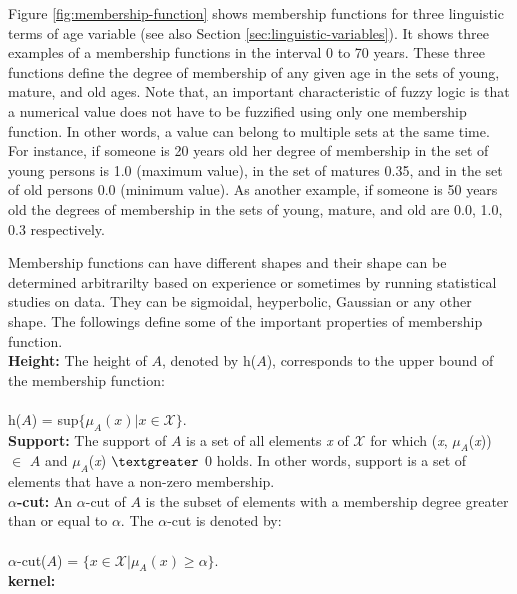 \documentclass[11pt]{article}
\begin{document}
Figure \ref{fig:membership-function} shows membership functions for three
linguistic terms of age variable (see also Section
\ref{sec:linguistic-variables}). It shows three examples of a membership
functions in the interval 0 to 70 years. These three functions define the degree
of membership of any given age in the sets of young, mature, and old ages. Note
that, an important characteristic of fuzzy logic is that a numerical value does
not have to be fuzzified using only one membership function. In other words, a
value can belong to multiple sets at the same time. For instance, if someone is
20 years old her degree of membership in the set of young persons is 1.0
(maximum value), in the set of matures 0.35, and in the set of old persons 0.0
(minimum value). As another example, if someone is 50 years old the degrees of
membership in the sets of young, mature, and old are 0.0, 1.0, 0.3 respectively.

Membership functions can have different shapes and their shape can be determined
arbitrarilty based on experience or sometimes by running statistical studies on
data. They can be sigmoidal, heyperbolic, Gaussian or any other shape. The
followings define some of the important properties of membership function.\\

\textbf{Height:} The height of $\textit{A}$, denoted by
$\textit{h}$($\textit{A}$), corresponds to the upper bound of the membership
function:\\ \\$\textit{h}$($\textit{A}$) = sup$\{\mu_A(\textit{x}) | \textit{x}
\in \mathcal{X}\}$.\\

\textbf{Support:} The support of $\textit{A}$ is a set of all elements
\textit{x} of $\mathcal{X}$ for which (\textit{x}, $\mu_A$(\textit{x})) $\in$
$\textit{A}$ and $\mu_A$(\textit{x}) $\textgreater$ 0 holds. In other words,
support is a set of elements that have a non-zero membership.\\

\textbf{$\alpha$-cut:} An $\alpha$-cut of $\textit{A}$ is the subset of elements
with a membership degree greater than or equal to $\alpha$. The $\alpha$-cut is
denoted by:\\ \\$\alpha$-cut($\textit{A}$) = $\{\textit{x} \in \mathcal{X} |
\mu_A(\textit{x}) \geqslant \alpha\}$.\\

\textbf{kernel:}
\end{document}
